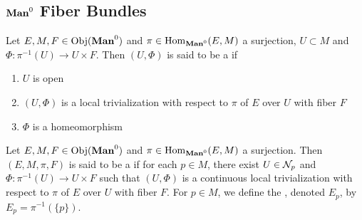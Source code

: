 \documentclass{book}
\begin{document}
	
	\subsection{$\Man0$ Fiber Bundles}
	
	\begin{defn} 
		Let $E, M, F \in \Obj(\Man0)$ and $\pi \in \Hom_{\Man0}(E, M)$ a surjection, $U \subset M$ and $\Phi: \pi^{-1}(U) \rightarrow U \times F$. Then $(U, \Phi)$ is said to be a   if 
		\begin{enumerate}
			\item $U$ is open
			\item $(U, \Phi)$ is a local trivialization with respect to $\pi$ of $E$ over $U$ with fiber $F$
			\item $\Phi$ is a homeomorphism
		\end{enumerate}
	\end{defn}
 
	\begin{defn} 
		Let $E,M, F \in \Obj(\Man0)$ and $\pi \in \Hom_{\Man0}(E, M)$ a surjection. Then $(E, M, \pi, F)$ is said to be a  if for each $p \in M$, there exist $U \in \mathcal{N}_p$ and $\Phi: \pi^{-1}(U) \rightarrow U \times F$ such that $(U, \Phi)$ is a continuous local trivialization with respect to $\pi$ of $E$ over $U$ with fiber $F$. For $p \in M$, we define the , denoted $E_p$, by $E_p = \pi^{-1}(\{p\})$.
	\end{defn}
\end{document}
